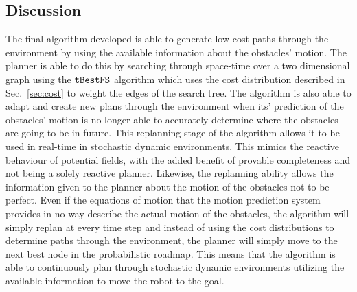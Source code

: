 %
%
%
%
%
%
%

\subsection{Discussion}

\label{sec:plannerdiscussion}

The final algorithm developed is able to generate low cost paths through the
environment by using the available information about the obstacles' motion. The
planner is able to do this by searching through space-time over a two
dimensional graph using the $\Acronym{tBestFS}$ algorithm which uses the cost
distribution described in Sec.~\ref{sec:cost} to weight the edges of the search
tree. The algorithm is also able to adapt and create new plans through the
environment when its' prediction of the obstacles' motion is no longer able to
accurately determine where the obstacles are going to be in future. This
replanning stage of the algorithm allows it to be used in real-time in
stochastic dynamic environments. This mimics the reactive behaviour of
potential fields, with the added benefit of provable completeness and not being
a solely reactive planner. Likewise, the replanning ability allows the
information given to the planner about the motion of the obstacles not to be
perfect. Even if the equations of motion that the motion prediction system
provides in no way describe the actual motion of the obstacles, the algorithm
will simply replan at every time step and instead of using the cost
distributions to determine paths through the environment, the planner will
simply move to the next best node in the probabilistic roadmap. This means that
the algorithm is able to continuously plan through stochastic dynamic
environments utilizing the available information to move the robot to the goal.


